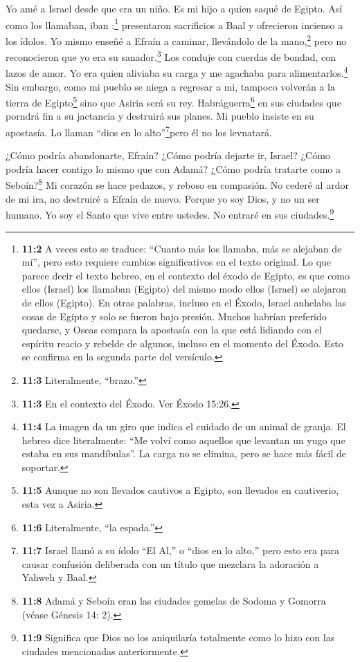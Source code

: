 Yo amé a Israel desde que era un niño. Es mi hijo a quien
saqué de Egipto.  Así como los llamaban, iban :\footnote{\textbf{11:2}
  A veces esto se traduce: ``Cuanto más los llamaba, más se alejaban de
  mí'', pero esto requiere cambios significativos en el texto original.
  Lo que parece decir el texto hebreo, en el contexto del éxodo de
  Egipto, es que como ellos (Israel) los llamaban (Egipto) del mismo
  modo ellos (Israel) se alejaron de ellos (Egipto). En otras palabras,
  incluso en el Éxodo, Israel anhelaba las cosas de Egipto y solo se
  fueron bajo presión. Muchos habrían preferido quedarse, y Oseas
  compara la apostasía con la que está lidiando con el espíritu reacio y
  rebelde de algunos, incluso en el momento del Éxodo. Esto se confirma
  en la segunda parte del versículo.} presentaron sacrificios a Baal y
ofrecieron incienso a los ídolos.  Yo mismo enseñé a Efraín
a caminar, llevándolo de la mano,\footnote{\textbf{11:3} Literalmente,
  ``brazo.''} pero no reconocieron que yo era su sanador.\footnote{\textbf{11:3}
  En el contexto del Éxodo. Ver Éxodo 15:26.}  Los conduje
con cuerdas de bondad, con lazos de amor. Yo era quien aliviaba su carga
y me agachaba para alimentarlos.\footnote{\textbf{11:4} La imagen da un
  giro que indica el cuidado de un animal de granja. El hebreo dice
  literalmente: ``Me volví como aquellos que levantan un yugo que estaba
  en sus mandíbulas''. La carga no se elimina, pero se hace más fácil de
  soportar.}  Sin embargo, como mi pueblo se niega a
regresar a mi, tampoco volverán a la tierra de Egipto\footnote{\textbf{11:5}
  Aunque no son llevados cautivos a Egipto, son llevados en cautiverio,
  esta vez a Asiria.} sino que Asiria será su rey. 
Habráguerra\footnote{\textbf{11:6} Literalmente, ``la espada.''} en sus
ciudades que porndrá fin a su jactancia y destruirá sus planes.
 Mi pueblo insiste en su apostasía. Lo llaman ``dios en lo
alto''\footnote{\textbf{11:7} Israel llamó a su ídolo ``El Al,'' o
  ``dios en lo alto,'' pero esto era para causar confusión deliberada
  con un título que mezclara la adoración a Yahweh y Baal.}pero él no
los levnatará.

 ¿Cómo podría abandonarte, Efraín? ¿Cómo podría dejarte ir,
Israel? ¿Cómo podría hacer contigo lo mismo que con Adamá? ¿Cómo podría
tratarte como a Seboín?\footnote{\textbf{11:8} Adamá y Seboín eran las
  ciudades gemelas de Sodoma y Gomorra (véase Génesis 14: 2).} Mi
corazón se hace pedazos, y reboso en compasión.  No cederé
al ardor de mi ira, no destruiré a Efraín de nuevo. Porque yo soy Dios,
y no un ser humano. Yo soy el Santo que vive entre ustedes. No entraré
en sus ciudades.\footnote{\textbf{11:9} Significa que Dios no los
  aniquilaría totalmente como lo hizo con las ciudades mencionadas
  anteriormente.}

